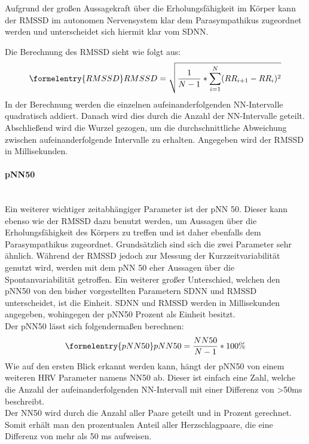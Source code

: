 Aufgrund der großen Aussagekraft über die Erholungsfähigkeit im Körper kann der \acs{RMSSD} im autonomen Nervensystem klar dem Parasympathikus zugeordnet werden und unterscheidet sich hiermit klar vom \acs{SDNN}.\cite[S.22]{babilon}

Die Berechnung des \acs{RMSSD} sieht wie folgt aus:
\begin{equation}\formelentry{RMSSD}
	RMSSD = \sqrt{\dfrac{1}{N-1} * \sum\limits_{i=1}^{N}  (RR_{i+1} - RR_i)^{2}}
\end{equation}
In der Berechnung werden die einzelnen aufeinanderfolgenden NN-Intervalle quadratisch addiert. Danach wird dies durch die Anzahl der NN-Intervalle geteilt. Abschließend wird die Wurzel gezogen, um die durchschnittliche Abweichung zwischen aufeinanderfolgende Intervalle zu erhalten. Angegeben wird der RMSSD in Millisekunden.\cite{rmssdart}\cite{zeit} \\


\paragraph{pNN50}\mbox{} \\
Ein weiterer wichtiger zeitabhängiger Parameter ist der pNN 50. Dieser kann ebenso wie der \acs{RMSSD} dazu benutzt werden, um Aussagen über die Erholungsfähigkeit des Körpers zu treffen und ist daher ebenfalls dem Parasympathikus zugeordnet. Grundsätzlich sind sich die zwei Parameter sehr ähnlich.
Während der \acs{RMSSD} jedoch zur Messung der Kurzzeitvariabilität genutzt wird, werden mit dem pNN 50 eher Aussagen über die Spontanvariabilität getroffen. \cite[S.2]{babilon}
Ein weiterer großer Unterschied, welchen den pNN50 von den bisher vorgestellten Parametern \acs{SDNN} und \acs{RMSSD} unterscheidet, ist die Einheit. \acs{SDNN} und \acs{RMSSD} werden in Millisekunden angegeben, wohingegen der pNN50 Prozent als Einheit besitzt. \\

Der pNN50 lässt sich folgendermaßen berechnen:
\begin{equation}\formelentry{pNN50}
	pNN50 =\dfrac{NN50}{N-1} * 100\%
\end{equation}
Wie auf den ersten Blick erkannt werden kann, hängt der pNN50 von einem weiteren \acs{HRV} Parameter namens NN50 ab. Dieser ist einfach eine Zahl, welche die Anzahl der aufeinanderfolgenden NN-Intervall mit einer Differenz von >50ms beschreibt.\\
Der NN50 wird durch die Anzahl aller Paare geteilt und in Prozent gerechnet. Somit erhält man den prozentualen Anteil aller Herzschlagpaare, die eine Differenz von mehr als 50 ms aufweisen. \cite{zeit}

